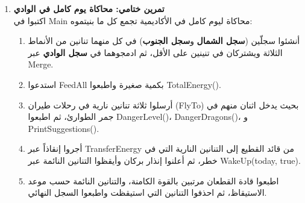 \documentclass[14pt]{extarticle}
\begin{document}
\begin{enumerate}[label=\textbf{تمرين \arabic*:}, wide=0pt, leftmargin=*, itemsep=2.2em]
    \item \textbf{تمرين ختامي: محاكاة يوم كامل في الوادي} \\
    اكتبوا في \textenglish{Main} محاكاة ليوم كامل في الأكاديمية تجمع كل ما بنيتموه:
    \begin{enumerate}[label=\textbf{\arabic*.}]
        \item أنشئوا سجلّين (\textbf{سجل الشمال} و\textbf{سجل الجنوب}) في كل منهما تنانين من الأنماط الثلاثة ويشتركان في تنينين على الأقل، ثم ادمجوهما في \textbf{سجل الوادي} عبر \textenglish{Merge}.
        \item استدعوا \textenglish{FeedAll} بكمية صغيرة واطبعوا \textenglish{TotalEnergy()}.
        \item أرسلوا ثلاثة تنانين نارية في رحلات طيران (\textenglish{FlyTo}) بحيث يدخل اثنان منهم في جمر الطوارئ، ثم اطبعوا \textenglish{DangerLevel()}، \textenglish{DangerDragons()}، و \textenglish{PrintSuggestions()}.
        \item أجروا إنقاذاً عبر \textenglish{TransferEnergy} من قائد القطيع إلى التنانين النارية التي في خطر، ثم أعلنوا إنذار بركان وأيقظوا التنانين النائمة عبر \textenglish{WakeUp(today, true)}.
        \item اطبعوا قادة القطعان مرتبين بالقوة الكامنة، والتنانين النائمة حسب موعد الاستيقاظ، ثم احذفوا التنانين التي استيقظت واطبعوا السجل النهائي.
    \end{enumerate}

\end{enumerate}
\end{document}
